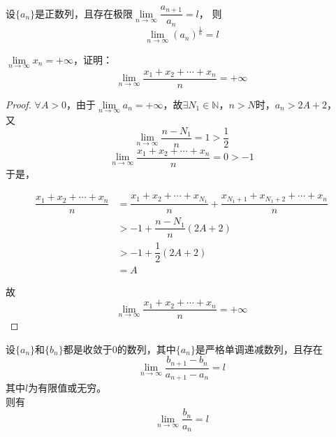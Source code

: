 \begin{corollary}[Cauthy命题推论]
    设$\{a_n\}$是正数列，且存在极限$\lim\limits_{n\to\infty}{\dfrac{a_{n+1}}{a_n}}=l$，
    则
    $$\lim_{n\to\infty}{(a_n)^{\frac{1}{n}}}=l$$
\end{corollary}

\begin{proposition}

    $\lim\limits_{n\to\infty}{x_n} = +\infty$，证明：
    $$\lim_{n\to\infty}{\dfrac{x_1 + x_2 + \cdots + x_n}{n}} = +\infty$$

\end{proposition}

\begin{proof} 

    $\forall A > 0$，由于$\lim\limits_{n\to\infty}{a_n} = +\infty$，故$\exists N_1 \in \mathbb{N}$，$n>N$时，$a_n > 2A + 2$，\\
    又
    $$\lim\limits_{n\to\infty}{\dfrac{n-N_1}{n}} = 1 > \dfrac{1}{2}$$
    $$\lim\limits_{n\to\infty}{\dfrac{x_1 + x_2 + \cdots + x_n}{n}} = 0 > -1$$
    于是，

    \begin{align*}
        \dfrac{x_1 + x_2 + \cdots + x_n}{n} & = \dfrac{x_1 + x_2 + \cdots + x_{N_1}}{n} + \dfrac{x_{N_1+1} + x_{N_1+2} + \cdots + x_n}{n} \\
        & > -1 + \dfrac{n-N_1}{n}(2A+2) \\
        & > -1 + \dfrac{1}{2}(2A + 2) \\
        & = A 
    \end{align*}

    故
    $$\lim_{n\to\infty}{\dfrac{x_1 + x_2 + \cdots + x_n}{n}} = +\infty$$
    
\end{proof} 

\begin{proposition}

    设$\{a_n\}$和$\{b_n\}$都是收敛于$0$的数列，其中$\{a_n\}$是严格单调递减数列，且存在
    $$\lim_{n\to\infty}{\dfrac{b_{n+1}- b_n}{a_{n+1}-a_n}} = l $$
    其中$l$为有限值或无穷。\\
    则有
    $$\lim_{n\to\infty}{\dfrac{b_n}{a_n}} = l$$

\end{proposition}

